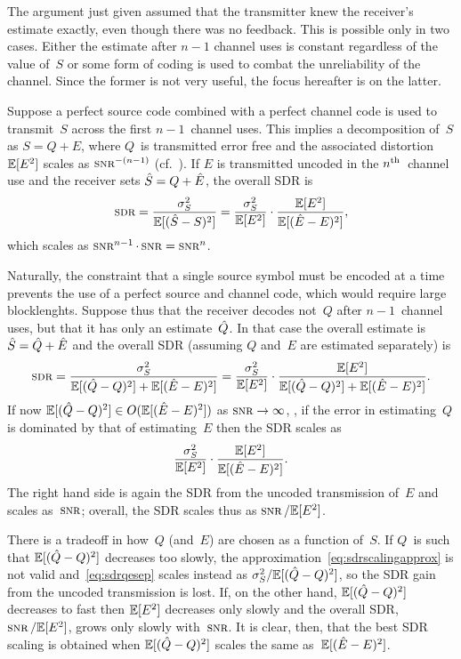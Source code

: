 The argument just given assumed that the transmitter knew the receiver's
estimate exactly, even though there was no feedback. This is possible only in
two cases.  Either the estimate after $n-1$ channel uses is constant regardless
of the value of~$S$ or some form of coding is used to combat the unreliability
of the channel. Since the former is not very useful, the focus hereafter is on
the latter.

Suppose a perfect source code combined with a perfect channel code is
used to transmit~$S$ across the first $n-1$~channel uses. This implies a
decomposition of~$S$ as $S = Q + E$, where $Q$~is transmitted error free and
the associated distortion $\mathbb{E}[E^2]$ scales as $\snr^{-(n-1)}$
(cf.~). If $E$ is transmitted uncoded in the $n{^{\text{th}}}$~channel use
and the receiver sets ${\hat{S}} = Q + \hat{E}$, the overall SDR is
\begin{equation*}
  \sdr = \frac{\ssq}{\mse} = \frac{\ssq}{\E[E^2]} \cdot \frac{\E[E^2]}{\E[(\Eh -
  E)^2]},
\end{equation*}
which scales as $\snr^{n-1} \cdot \snr = \snr^n$. 

Naturally, the constraint that a single source symbol must be encoded at a
time prevents the use of a perfect source and channel code, which would require
large blocklenghts. Suppose thus that
the receiver decodes not~$Q$ after $n-1$~channel uses, but that it has only an
estimate~$\hat{Q}$. In that case the overall estimate is ${\hat{S}} = \hat{Q} + \hat{E}$ and the
overall SDR (assuming $Q$ and~$E$ are estimated separately) is
\begin{equation}
  \label{eq:sdrqesep}
  \sdr = \frac{\ssq}{\mseq + \msee} =
  \frac{\ssq}{\E[E^2]} \cdot \frac{\E[E^2]}{\mseq + \E[(\Eh - E)^2]}.
\end{equation}
If now ${\mathbb{E}[(\hat{Q} - Q)^2]} \in O({\mathbb{E}[(\hat{E} - E)^2]})$ as $\snr \goesto \infty$, \ie,
if the error in estimating~$Q$ is dominated by that of estimating~$E$ then
the SDR scales as
\begin{equation}
  \label{eq:sdrscalingapprox}
  \frac{{\sigma_S^2}}{\mathbb{E}[E^2]} \cdot \frac{\mathbb{E}[E^2]}{{\mathbb{E}[(\hat{E} - E)^2]}}.
\end{equation}
The right hand side is again the SDR from the uncoded transmission of~$E$ and
scales as~$\snr$; overall, the SDR scales thus as $\snr / \E[E^2]$.

There is a tradeoff in how~$Q$ (and~$E$) are chosen as a function of~$S$. If
$Q$~is such that
${\mathbb{E}[(\hat{Q} - Q)^2]}$ decreases too slowly, the approximation~\eqref{eq:sdrscalingapprox}
is not valid and~\eqref{eq:sdrqesep} scales instead as ${\sigma_S^2} / {\mathbb{E}[(\hat{Q} - Q)^2]}$, so the
SDR gain from the uncoded transmission is lost.  If, on the other hand, ${\mathbb{E}[(\hat{Q} - Q)^2]}$
decreases to fast then $\mathbb{E}[E^2]$ decreases only slowly and the overall SDR,
$\snr / \E[E^2]$, grows only slowly with~$\snr$. It is clear, then, that the
best SDR scaling is obtained when ${\mathbb{E}[(\hat{Q} - Q)^2]}$ scales the same as~${\mathbb{E}[(\hat{E} - E)^2]}$.

